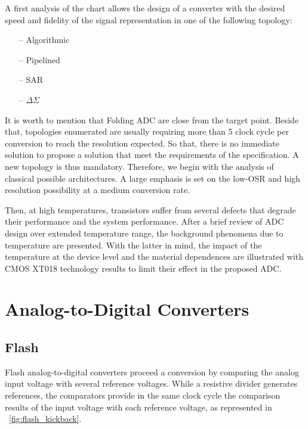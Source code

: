 A first analysis of the chart allows the design of a converter with the desired speed and fidelity of the signal representation in one of the following topology:
\begin{itemize}
    \item[--] Algorithmic
    \item[--] Pipelined
    \item[--] SAR
    \item[--] $\Delta\Sigma$
\end{itemize}
It is worth to mention that Folding ADC are close from the target point. Beside that, topologies enumerated are usually requiring more than 5 clock cycle per conversion to reach the resolution expected. So that, there is no immediate solution to propose a solution that meet the requirements of the specification. A new topology is thus mandatory. Therefore, we begin with the analysis of classical possible architectures. A large emphasis is set on the low-OSR and high resolution possibility at a medium conversion rate.

Then, at high temperatures, transistors suffer from several defects that degrade their performance and the system performance. After a brief review of ADC design over extended temperature range, the background phenomena due to temperature are presented. With the latter in mind, the impact of the temperature at the device level and the material dependences are illustrated with CMOS XT018 technology results to limit their effect in the proposed ADC\@. %
\section{Analog-to-Digital Converters}
\subsection{Flash}                             %
\label{sec:flash-adc}
Flash analog-to-digital converters proceed a conversion by comparing the analog input voltage with several reference voltages. While a resistive divider generates references, the comparators provide in the same clock cycle the comparison results of the input voltage with each reference voltage, as represented in \figurename~\ref{fig:flash_kickback}. 

